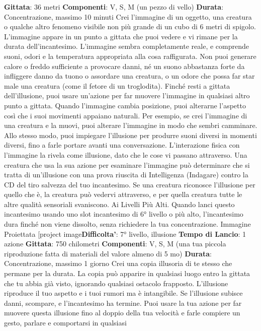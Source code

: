 \begin{multicols}{2}
\textbf{Gittata}: 36 metri
\textbf{Componenti}: V, S, M (un pezzo di vello)
\textbf{Durata}: Concentrazione, massimo 10 minuti
Crei l’immagine di un oggetto, una creatura o qualche
altro fenomeno visibile non più grande di un cubo di 6
metri di spigolo. L’immagine appare in un punto a
gittata che puoi vedere e vi rimane per la durata
dell’incantesimo. L’immagine sembra completamente
reale, e comprende suoni, odori e la temperatura
appropriata alla cosa raffigurata. Non puoi generare
calore o freddo sufficiente a provocare danni, né un
suono abbastanza forte da infliggere danno da tuono o
assordare una creatura, o un odore che possa far star
male una creatura (come il fetore di un troglodita).
Finché resti a gittata dell’illusione, puoi usare un’azione
per far muovere l’immagine in qualsiasi altro punto a
gittata. Quando l’immagine cambia posizione, puoi
alterarne l’aspetto così che i suoi movimenti appaiano
naturali. Per esempio, se crei l’immagine di una
creatura e la muovi, puoi alterare l’immagine in modo
che sembri camminare. Allo stesso modo, puoi
impiegare l’illusione per produrre suoni diversi in
momenti diversi, fino a farle portare avanti una
conversazione.
L’interazione fisica con l’immagine la rivela come
illusione, dato che le cose vi passano attraverso. Una
creatura che usa la sua azione per esaminare
l’immagine può determinare che si tratta di un’illusione
con una prova riuscita di Intelligenza (Indagare) contro
la CD del tiro salvezza del tuo incantesimo. Se una
creatura riconosce l’illusione per quello che è, la
creatura può vedervi attraverso, e per quella creatura
tutte le altre qualità sensoriali svaniscono.
Ai Livelli Più Alti. Quando lanci questo incantesimo
usando uno slot incantesimo di 6° livello o più alto,
l’incantesimo dura finché non viene dissolto, senza
richiedere la tua concentrazione.
Immagine Proiettata
[project image\textbf{Difficolta'}:
7° livello, illusione
\textbf{Tempo di Lancio}: 1 azione
\textbf{Gittata}: 750 chilometri
\textbf{Componenti}: V, S, M (una tua piccola riproduzione
fatta di materiali del valore almeno di 5 mo)
\textbf{Durata}: Concentrazione, massimo 1 giorno
Crei una copia illusoria di te stesso che permane per la
durata. La copia può apparire in qualsiasi luogo entro la
gittata che tu abbia già visto, ignorando qualsiasi
ostacolo frapposto. L’illusione riproduce il tuo aspetto e
i tuoi rumori ma è intangibile. Se l’illusione subisce
danni, scompare, e l’incantesimo ha termine.
Puoi usare la tua azione per far muovere questa
illusione fino al doppio della tua velocità e farle
compiere un gesto, parlare e comportarsi in qualsiasi

\end{multicols}
